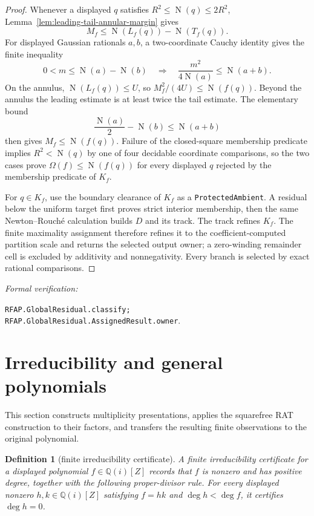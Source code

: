 \documentclass[11pt]{article}
\newtheorem{definition}[theorem]{Definition}
\newcommand{\Qi}{\mathbb{Q}(i)}
\newcommand{\Norm}[1]{\operatorname{N}\!\left(#1\right)}
\newcommand{\leanref}[1]{\par\smallskip\noindent
  \emph{Formal verification:}\par\nobreak
  {\raggedright\nolinkurl{#1}.\par}}
\begin{document}
\begin{proof}
Whenever a displayed $q$ satisfies
$R^2\le\Norm q\le2R^2$,
Lemma~\ref{lem:leading-tail-annular-margin} gives
\[
 M_f\le \Norm{L_f(q)}-\Norm{T_f(q)}.
\]
For displayed Gaussian rationals $a,b$, a
two-coordinate Cauchy identity gives the finite inequality
\[
 0<m\le\Norm a-\Norm b
 \quad\Longrightarrow\quad
 \frac{m^2}{4\Norm a}\le\Norm{a+b}.
\]
On the annulus, $\Norm{L_f(q)}\le U$, so
$M_f^2/(4U)\le\Norm{f(q)}$.  Beyond the annulus the leading estimate is at
least twice the tail estimate.  The elementary bound
\[
 \frac{\Norm a}{2}-\Norm b\le\Norm{a+b}
\]
then gives $M_f\le\Norm{f(q)}$.  Failure of the closed-square membership
predicate implies
$R^2<\Norm q$ by one of four decidable coordinate comparisons, so the two
cases prove $\Omega(f)\le\Norm{f(q)}$ for every displayed $q$ rejected by
the membership predicate of $K_f$.

For $q\in K_f$, use the boundary clearance of $K_f$ as a
\texttt{ProtectedAmbient}.  A residual below the uniform target first proves
strict interior membership, then the same Newton--Rouch\'e calculation builds
$D$ and its track.  The track refines $K_f$.  The finite maximality assignment
therefore refines it to the coefficient-computed partition scale and returns
the selected output owner; a zero-winding remainder cell is excluded by
additivity and nonnegativity.  Every branch is selected by exact rational
comparisons.
\end{proof}

\leanref{RFAP.GlobalResidual.classify;
RFAP.GlobalResidual.AssignedResult.owner}

\section{Irreducibility and general polynomials}
\label{sec:general-polynomials}

This section constructs multiplicity presentations, applies the squarefree
RAT construction to their factors, and transfers the resulting finite
observations to the original polynomial.

\begin{definition}[finite irreducibility certificate]
\label{def:irreducibility-certificate}
A \emph{finite irreducibility certificate} for a displayed polynomial
$f\in\Qi[Z]$ records that $f$ is nonzero and has positive degree, together
with the following proper-divisor rule.  For every displayed nonzero
$h,k\in\Qi[Z]$ satisfying $f=hk$ and $\deg h<\deg f$, it certifies
$\deg h=0$.
\end{definition}
\end{document}
